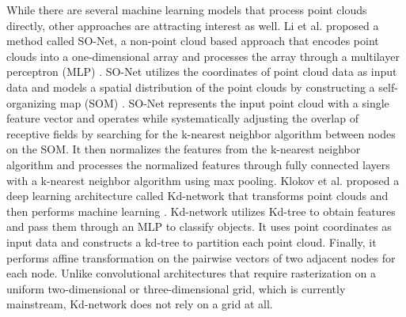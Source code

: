 While there are several machine learning models that process point clouds directly, other approaches are attracting interest as well. 
  Li et al. proposed a method called SO-Net, a non-point cloud based approach that encodes point clouds into a one-dimensional array and processes the array through a multilayer perceptron (MLP) \cite{Li_2018_CVPR}. 
    SO-Net utilizes the coordinates of point cloud data as input data and models a spatial distribution of the point clouds by constructing a self-organizing map (SOM) \cite{58325}. 
    SO-Net represents the input point cloud with a single feature vector and operates while systematically adjusting the overlap of receptive fields by searching for the k-nearest neighbor algorithm between nodes on the SOM. 
    It then normalizes the features from the k-nearest neighbor algorithm and processes the normalized features through fully connected layers with a k-nearest neighbor algorithm using max pooling. 
  Klokov et al. proposed a deep learning architecture called Kd-network that transforms point clouds and then performs machine learning \cite{8237361}. 
    Kd-network utilizes Kd-tree to obtain features and pass them through an MLP to classify objects. 
    It uses point coordinates as input data and constructs a kd-tree to partition each point cloud. 
    Finally, it performs affine transformation on the pairwise vectors of two adjacent nodes for each node. 
    Unlike convolutional architectures that require rasterization on a uniform two-dimensional or three-dimensional grid, which is currently mainstream, Kd-network does not rely on a grid at all. 

